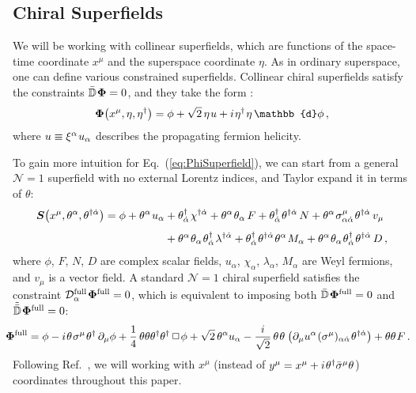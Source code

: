 \documentclass[12pt,document,nofootinbib,superscriptaddress,onecolumn,preprintnumbers,balancelastpage]{article}
\newcommand{\full}{\text{full}}
\newcommand{\s}{\hspace{0.8pt}}
\newcommand{\PP}{\mathbb{d}}
\DeclareRobustCommand{\Eq}[1]{Eq.~(\ref{#1})}
\DeclareRobustCommand{\Ref}[1]{Ref.~\cite{#1}}
\newcommand{\bPhi}{ \boldsymbol \Phi}
\newcommand{\D}{\mathbb{D}}
\begin{document}
\begin{spacing}{1.2}
\subsection{Chiral Superfields}
\label{subsec:chiralmultiplet}


We will be working with collinear superfields, which are functions of the space-time coordinate $x^\mu$ and the superspace coordinate $\eta$.
%
As in ordinary superspace, one can define various constrained superfields.
%
Collinear chiral superfields satisfy the constraints $\bar{ \D}\s  \bPhi = 0$, and they take the form \cite{Cohen:2018qvn}:
%
\begin{align}
 \label{eq:PhiSuperfield}
\bPhi\big(x^\mu, \eta, \eta^\dagger\big) = \phi + \sqrt{2} \, \eta\s u + i\s \eta^\dagger\s \eta \, \PP \phi \,,
 \end{align}
%
where $u \equiv \xi^\alpha \s u_\alpha$ describes the propagating fermion helicity.


To gain more intuition for \Eq{eq:PhiSuperfield}, we can start from a general $\mathcal{N}=1$ superfield with no external Lorentz indices, and Taylor expand it in terms of $\theta$:
% 
\begin{align}
\boldsymbol{S}\big(x^\mu, \theta^\alpha, \theta^{\dagger \dot{\alpha}}\big) = \phi + \theta^\alpha\s u_\alpha &+ \theta^\dagger_{\dot{\alpha}}\s \chi^{\dagger \dot{\alpha}} + \theta^\alpha\s \theta_\alpha\, F + \theta^\dagger_{\dot{\alpha}}\s \theta^{\dagger \dot{\alpha}} \,N + \theta^\alpha\s \sigma^\mu_{\alpha \dot{\alpha}}\s \theta^{\dagger \dot{\alpha}}\, v_\mu   \nonumber \\[4pt]
& + \theta^\alpha\s \theta_\alpha \s\theta^{\dagger}_{\dot{\alpha}}\s \lambda^{\dagger \dot{\alpha}} + \theta^\dagger_{\dot{\alpha}}\s \theta^{\dagger \dot{\alpha}}\s \theta^\alpha\s M_\alpha + \theta^\alpha\s \theta_\alpha \s \theta^\dagger_{\dot{\alpha}}\s \theta^{\dagger \dot{\alpha}}\, D\,, 
 \end{align}
%
where $\phi$, $F$, $N$, $D$ are complex scalar fields, $u_\alpha$, $\chi_\alpha$, $\lambda_\alpha$, $M_\alpha$ are Weyl fermions, and $v_\mu$ is a vector field.
%
A standard $\mathcal{N} = 1$ chiral superfield satisfies the constraint $\mathcal{D}_\alpha^\full\s \bPhi^{\full} = 0$, which is equivalent to imposing both 
$\bar{ \D} \s \bPhi^{\full} = 0$ and $\tilde{\bar{ \D}} \s \bPhi^{\full} = 0$:
%
 \begin{align}
 \label{eq:PhiFulltheta}
\hspace{-7pt} \bPhi^{\full} = \phi - i\s \theta\s \sigma^\mu\s \theta^\dagger\, \partial_\mu \phi + \frac{1}{4}\, \theta \theta \theta^\dagger \theta^\dagger\, \Box\s \phi + \sqrt{2}\, \theta^\alpha u_\alpha - \frac{i}{\sqrt{2}}\, \theta\s \theta\s \left( \partial_\mu u^\alpha\s (\sigma^\mu)_{\alpha \dot{\alpha}}\s \theta^{\dagger \dot{\alpha}}  \right) + \theta \theta\s F \,. 
\end{align}
%
Following \Ref{Cohen:2018qvn}, we will working with $x^\mu$ (instead of $y^\mu = x^\mu + i\s \theta^\dag \bar{\sigma}^\mu \theta$) coordinates throughout this paper.



\end{spacing}
\end{document}
